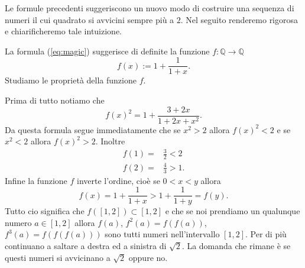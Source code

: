 \documentclass[10pt, twoside]{article}
\numberwithin{equation}{section}
\newcommand\Q{\mathbb Q}
\begin{document}
Le formule precedenti suggeriscono un nuovo modo di costruire una
sequenza di numeri il cui quadrato si avvicini sempre pi\`u a $2$. Nel
seguito renderemo rigorosa e chiarificheremo tale intuizione.

La formula (\ref{eq:magic}) suggerisce di definite la funzione
$f:\Q\to\Q$
\begin{equation}\label{eq:frazdef}
f(x):=1+\frac {1}{1+x}.
\end{equation}
Studiamo le propriet\`a della funzione $f$.

Prima di tutto notiamo che 
\[
f(x)^2=1+\frac{3+2x}{1+2x+x^2}.
\]
Da questa formula segue immediatamente che se $x^2>2$ allora $f(x)^2<2$ e se
$x^2<2$ allora $f(x)^2>2$. Inoltre
\[
\begin{split}
f(1)=&\frac 32<2\\
f(2)=&\frac 43>1.
\end{split}
\]
Infine la funzione $f$ inverte l'ordine, cio\`e se $0<x<y$ allora
\[
f(x)=1+\frac 1{1+x}>1+\frac 1{1+y}=f(y).
\]
Tutto cio significa che $f([1,2])\subset [1,2]$ e che se noi prendiamo
un qualunque numero $a\in[1,2]$ allora $f(a)$, $f^2(a)=f(f(a))$,
$f^3(a)=f(f(f(a)))$ sono tutti numeri nell'intervallo $[1,2]$. Per di
pi\`u continuano a saltare a destra ed a sinistra di $\sqrt 2$. La
domanda che rimane \`e se questi numeri si avvicinano a $\sqrt 2$ oppure no.
\end{document}
